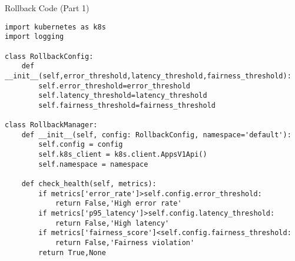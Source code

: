 \documentclass[aspectratio=169]{beamer}
\begin{document}

\begin{frame}[fragile]{Rollback Code (Part 1)}
\begin{verbatim}
import kubernetes as k8s
import logging

class RollbackConfig:
    def __init__(self,error_threshold,latency_threshold,fairness_threshold):
        self.error_threshold=error_threshold
        self.latency_threshold=latency_threshold
        self.fairness_threshold=fairness_threshold

class RollbackManager:
    def __init__(self, config: RollbackConfig, namespace='default'):
        self.config = config
        self.k8s_client = k8s.client.AppsV1Api()
        self.namespace = namespace

    def check_health(self, metrics):
        if metrics['error_rate']>self.config.error_threshold:
            return False,'High error rate'
        if metrics['p95_latency']>self.config.latency_threshold:
            return False,'High latency'
        if metrics['fairness_score']<self.config.fairness_threshold:
            return False,'Fairness violation'
        return True,None
\end{verbatim}
\end{frame}

\end{document}
